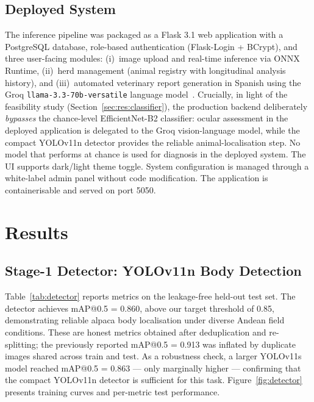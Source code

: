 \documentclass[journal=animals,article=article,submit=mdpi,moreauthors=true,pdftex]{mdpi}
\begin{document}
\subsection{Deployed System}
\label{sec:system}

The inference pipeline was packaged as a Flask 3.1 web application with a PostgreSQL
database, role-based authentication (Flask-Login + BCrypt), and three user-facing
modules: (i)~image upload and real-time inference via ONNX Runtime, (ii)~herd
management (animal registry with longitudinal analysis history), and (iii)~automated
veterinary report generation in Spanish using the Groq
\texttt{llama-3.3-70b-versatile} language model~\cite{groq2024}.
Crucially, in light of the feasibility study (Section~\ref{sec:res:classifier}), the
production backend deliberately \emph{bypasses} the chance-level EfficientNet-B2 classifier:
ocular assessment in the deployed application is delegated to the Groq vision-language model,
while the compact YOLOv11n detector provides the reliable animal-localisation step. No
model that performs at chance is used for diagnosis in the deployed system.
The UI supports dark/light theme toggle.
System configuration is managed through a white-label admin panel without code
modification.
The application is containerisable and served on port 5050.

\section{Results}
\label{sec:results}

\subsection{Stage-1 Detector: YOLOv11n Body Detection}
\label{sec:res:detector}

Table~\ref{tab:detector} reports metrics on the leakage-free held-out test set.
The detector achieves mAP@0.5 = 0.860, above our target threshold of 0.85,
demonstrating reliable alpaca body localisation under diverse Andean field conditions.
These are honest metrics obtained after deduplication and re-splitting; the previously
reported mAP@0.5 = 0.913 was inflated by duplicate images shared across train and test.
As a robustness check, a larger YOLOv11s model reached mAP@0.5 = 0.863 --- only
marginally higher --- confirming that the compact YOLOv11n detector is sufficient for
this task.
Figure~\ref{fig:detector} presents training curves and per-metric test performance.
\end{document}
